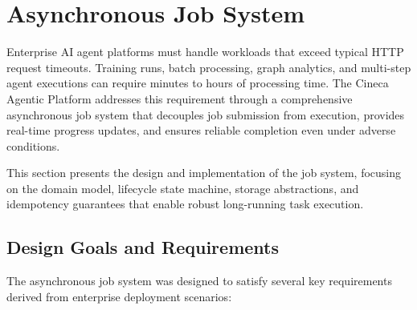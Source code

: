 
\section{Asynchronous Job System}
\label{sec:job-system}

Enterprise AI agent platforms must handle workloads that exceed typical HTTP request timeouts. Training runs, batch processing, graph analytics, and multi-step agent executions can require minutes to hours of processing time. The Cineca Agentic Platform addresses this requirement through a comprehensive asynchronous job system that decouples job submission from execution, provides real-time progress updates, and ensures reliable completion even under adverse conditions.

This section presents the design and implementation of the job system, focusing on the domain model, lifecycle state machine, storage abstractions, and idempotency guarantees that enable robust long-running task execution.

\subsection{Design Goals and Requirements}

The asynchronous job system was designed to satisfy several key requirements derived from enterprise deployment scenarios:

